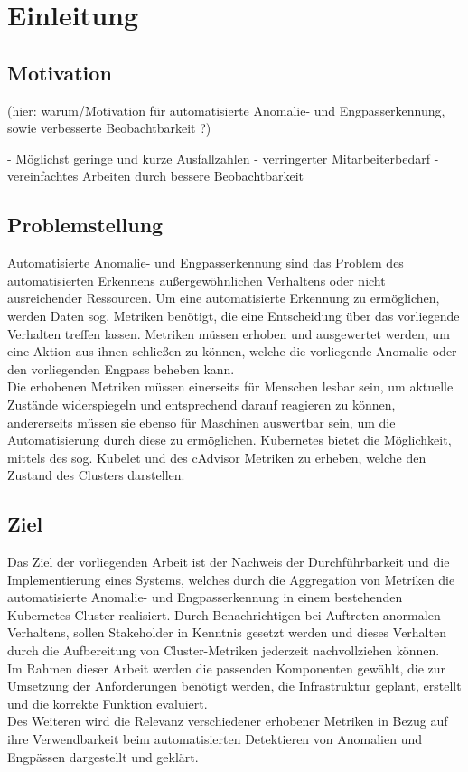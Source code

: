 \documentclass[a4paper,12pt]{scrartcl}
\title{}
\author{Johannes Bohlig}
\date{\today}
\begin{document}
\tableofcontents

\pagebreak

\section{Einleitung}
\subsection{Motivation}

(hier: warum/Motivation für automatisierte Anomalie- und Engpasserkennung, sowie verbesserte Beobachtbarkeit ?)

- Möglichst geringe und kurze Ausfallzahlen
- verringerter Mitarbeiterbedarf
- vereinfachtes Arbeiten durch bessere Beobachtbarkeit


\subsection{Problemstellung}

Automatisierte Anomalie- und Engpasserkennung sind das Problem des automatisierten Erkennens außergewöhnlichen Verhaltens oder nicht ausreichender Ressourcen. Um eine automatisierte Erkennung zu ermöglichen, werden Daten sog. Metriken benötigt, die eine Entscheidung über das vorliegende Verhalten treffen lassen. Metriken müssen erhoben und ausgewertet werden, um eine Aktion aus ihnen schließen zu können, welche die vorliegende Anomalie oder den vorliegenden Engpass beheben kann.\\
Die erhobenen Metriken müssen einerseits für Menschen lesbar sein, um aktuelle Zustände widerspiegeln und entsprechend darauf reagieren zu können, andererseits müssen sie ebenso für Maschinen auswertbar sein, um die Automatisierung durch diese zu ermöglichen.
Kubernetes bietet die Möglichkeit, mittels des sog. Kubelet und des cAdvisor Metriken zu erheben, welche den Zustand des Clusters darstellen. 

\subsection{Ziel}

Das Ziel der vorliegenden Arbeit ist der Nachweis der Durchführbarkeit und die Implementierung eines Systems, welches durch die Aggregation von Metriken die automatisierte Anomalie- und Engpasserkennung in einem bestehenden Kubernetes-Cluster realisiert. Durch Benachrichtigen bei Auftreten anormalen Verhaltens, sollen Stakeholder in Kenntnis gesetzt werden und dieses Verhalten durch die Aufbereitung von Cluster-Metriken jederzeit nachvollziehen können.\\
Im Rahmen dieser Arbeit werden die passenden Komponenten gewählt, die zur Umsetzung der Anforderungen benötigt werden, die Infrastruktur geplant, erstellt und die korrekte Funktion evaluiert.\\
Des Weiteren wird die Relevanz verschiedener erhobener Metriken in Bezug auf ihre Verwendbarkeit beim automatisierten Detektieren von Anomalien und Engpässen dargestellt und geklärt.
\end{document}
